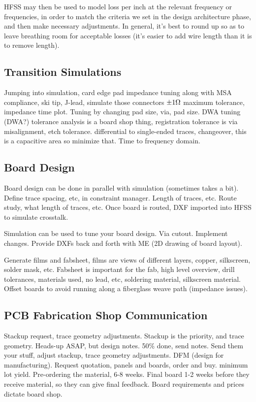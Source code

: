 \documentclass{article}
\begin{document}
HFSS may then be used to model loss per inch at the relevant frequency or frequencies, in order to match the criteria we set in the design architecture phase, and then make necessary adjustments. In general, it's best to round up so as to leave breathing room for acceptable losses (it's easier to add wire length than it is to remove length).

\subsection{Transition Simulations}
Jumping into simulation, card edge pad impedance tuning along with MSA compliance, ski tip, J-lead, simulate those connectors \(\pm 1 \ohm\) maximum tolerance, impedance time plot. Tuning by changing pad size, via, pad size. DWA tuning (DWA?) tolerance analysis is a board shop thing, registration tolerance is via misalignment, etch tolerance. differential to single-ended traces, changeover, this is a capacitive area so minimize that. Time to frequency domain.

\subsection{Board Design}
Board design can be done in parallel with simulation (sometimes takes a bit). Define trace spacing, etc, in constraint manager. Length of traces, etc. Route study, what length of traces, etc. Once board is routed, DXF imported into HFSS to simulate crosstalk.

Simulation can be used to tune your board design. Via cutout. Implement changes. Provide DXFs back and forth with ME (2D drawing of board layout). 

Generate films and fabsheet, films are views of different layers, copper, silkscreen, solder mask, etc. Fabsheet is important for the fab, high level overview, drill tolerances, materials used, no lead, etc, soldering material, silkscreen material. Offset boards to avoid running along a fiberglass weave path (impedance issues).

\subsection{PCB Fabrication Shop Communication}
Stackup request, trace geometry adjustments. Stackup is the priority, and trace geometry. Heads-up ASAP, but design notes. 50\% done, send notes. Send them your stuff, adjust stackup, trace geometry adjustments. DFM (design for manufacturing). Request quotation, panels and boards, order and buy. minimum lot yield. Pre-ordering the material, 6-8 weeks. Final board 1-2 weeks before they receive material, so they can give final feedback. Board requirements and prices dictate board shop.
\end{document}
